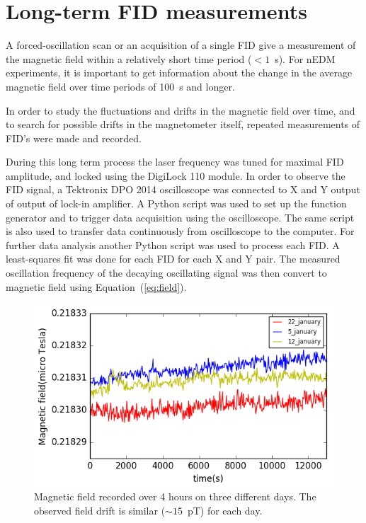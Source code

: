 \section{Long-term FID measurements}

A forced-oscillation scan or an acquisition of a single FID give a
measurement of the magnetic field within a relatively short time
period ($<1$~s).  For nEDM experiments, it is important to get
information about the change in the average magnetic field over time
periods of 100~s and longer.

In order to study the fluctuations and drifts in the magnetic field
over time, and to search for possible drifts in the magnetometer
itself, repeated measurements of FID's were made and recorded.

During this long term process the laser frequency was tuned for
maximal FID amplitude, and locked using the DigiLock 110 module.  In
order to observe the FID signal, a Tektronix DPO 2014 oscilloscope was
connected to X and Y output of output of lock-in amplifier. A Python
script was used to set up the function generator and to trigger data
acquisition using the oscilloscope. The same script is also used to
transfer data continuously from oscilloscope to the computer.  For
further data analysis another Python script was used to process each
FID.  A least-squares fit was done for each FID for each X and Y pair.
The measured oscillation frequency of the decaying oscillating signal
was then convert to magnetic field using Equation~(\ref{eq:field}).

\begin{figure}%
\centering\includegraphics[width=0.85\linewidth]{figures/field_3_day}
\caption{Magnetic field recorded over 4 hours on three different
  days. The observed field drift is similar ($\sim 15$~pT) for each
  day.\label{fig:long-term-field}}
\end{figure}

